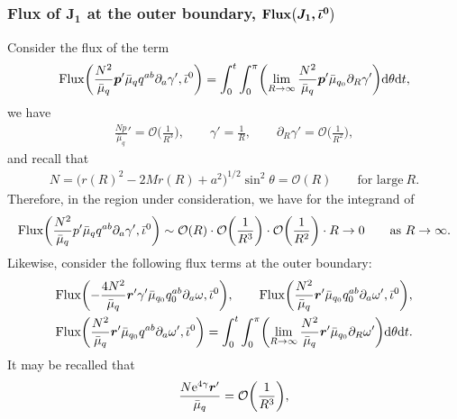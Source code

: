 \documentclass[pdftex]{sigma}
\def\ptl{\partial}%
\def\mbo#1{\boldsymbol{#1}}%
\numberwithin{equation}{section}
\begin{document}
\subsubsection*{Flux of $\boldsymbol{J_1}$ at the outer boundary, $\boldsymbol{{\rm Flux} \bigl(J_1, \bar{\iota}^0\bigr)}$}
 Consider the flux of the term
\begin{align*}
{\rm Flux} \biggl(\frac{N^2}{ \bar{\mu}_q} \mbo{p}' \bar{\mu}_q q^{ab} \ptl_a \gamma', \bar{\iota}^0 \biggr) = \int^t_0 \int^\pi_0 \biggl(\lim_{R \to \infty} \frac{N^2}{ \bar{\mu}_q} \mbo{p}' \bar{\mu}_{q_0} \ptl_R \gamma' \biggr) {\rm d}\theta {\rm d}t,
\end{align*}
we have
\begin{align*}
\frac{N p}{\bar{\mu}_q}' = \mathcal{O} \biggl(\frac{1}{R^3} \biggr), \qquad \gamma' = \frac{1}{R}, \qquad \ptl_R \gamma' = \mathcal{O} \biggl(\frac{1}{R^2} \biggr),
\end{align*}
and recall that
\begin{align*}
N = \bigl(r(R)^2 - 2Mr(R) + a^2\bigr)^{1/2} \sin^2 \theta = \mathcal{O}(R) \qquad \text{for large} \ R.
\end{align*}
Therefore, in the region under consideration, we have for the integrand of
\[
{\rm Flux} \biggl(\frac{N^2}{ \bar{\mu}_q} p' \bar{\mu}_q q^{ab} \ptl_a \gamma', \bar{\iota}^0 \biggr) \sim \mathcal{O}(R) \cdot \mathcal{O} \biggl(\frac{1}{R^3}\biggr) \cdot \mathcal{O} \biggl(\frac{1}{R^2}\biggr) \cdot R \to 0 \qquad\text{as}\ R \to \infty.
\]
Likewise, consider the following flux terms at the outer boundary:
\begin{align*}
&{\rm Flux} \biggl(-\frac{4 N^2}{\bar{\mu}_q} \mbo{r}' \gamma' \bar{\mu}_{q_0} q_0^{ab} \ptl_a \omega, \bar{\iota}^0 \biggr), \qquad {\rm Flux} \biggl(\frac{N^2}{\bar{\mu}_q} \mbo{r}' \bar{\mu}_{q_0} q_0^{ab} \ptl_a \omega', \bar{\iota}^0 \biggr),
\\
&{\rm Flux} \biggl(\frac{N^2}{\bar{\mu}_q} \mbo{r}' \bar{\mu}_{q_0} q^{ab} \ptl_a \omega', \bar{\iota}^0 \biggr) = \int^t_0 \int^\pi_0 \biggl( \lim_{R \to \infty} \frac{N^2}{\bar{\mu}_q} \mbo{r}' \bar{\mu}_{q_0} \ptl_R \omega' \biggr) {\rm d} \theta {\rm d}t.
\end{align*}
It may be recalled that
\begin{align*}
\frac{N {\rm e}^{4 \gamma} \mbo{r}'}{\bar{\mu}_q} = \mathcal{O} \biggl(\frac{1}{R^3} \biggr),
\end{align*}
\end{document}

